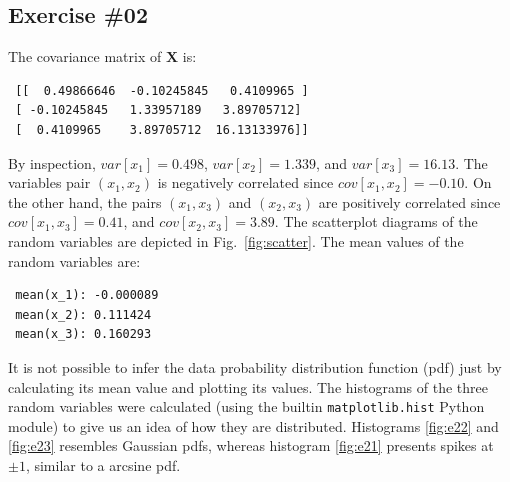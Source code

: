 \documentclass[a4paper,12pt]{article}
\newcommand{\mb}[1]{\ensuremath{\mathbf{#1}}}
\begin{document}
\subsection*{Exercise \#02}
The covariance matrix of $\mb{X}$ is:
\begin{verbatim}
 [[  0.49866646  -0.10245845   0.4109965 ]
 [ -0.10245845   1.33957189   3.89705712]
 [  0.4109965    3.89705712  16.13133976]]
\end{verbatim}
By inspection, $var[x_1] = 0.498$, $var[x_2] = 1.339$, and $var[x_3]=16.13$. The variables pair $(x_1,x_2)$ is negatively correlated since $cov[x_1,x_2] = -0.10$. On the other hand, the pairs $(x_1,x_3)$ and $(x_2,x_3)$ are positively correlated since $cov[x_1,x_3] = 0.41$, and $cov[x_2,x_3] = 3.89$. The scatterplot diagrams of the random variables are depicted in Fig.~\ref{fig:scatter}. The mean values of the random variables are:
\begin{verbatim}
 mean(x_1): -0.000089
 mean(x_2): 0.111424
 mean(x_3): 0.160293
\end{verbatim}
It is not possible to infer the data probability distribution function (pdf) just by calculating its mean value and plotting its values. The histograms of the three random variables were calculated (using the builtin \verb|matplotlib.hist| Python module) to give us an idea of how they are distributed. Histograms \ref{fig:e22} and \ref{fig:e23} resembles Gaussian pdfs, whereas histogram \ref{fig:e21} presents spikes at $\pm 1$, similar to a arcsine pdf. 
\end{document}
